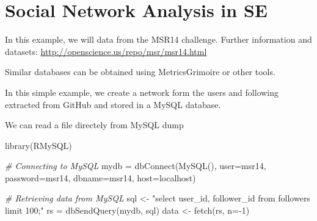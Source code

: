 \documentclass[
]{book}
\newenvironment{Shaded}{\begin{snugshade}}{\end{snugshade}}
\newcommand{\AttributeTok}[1]{\textcolor[rgb]{0.77,0.63,0.00}{#1}}
\newcommand{\CommentTok}[1]{\textcolor[rgb]{0.56,0.35,0.01}{\textit{#1}}}
\newcommand{\DecValTok}[1]{\textcolor[rgb]{0.00,0.00,0.81}{#1}}
\newcommand{\DocumentationTok}[1]{\textcolor[rgb]{0.56,0.35,0.01}{\textbf{\textit{#1}}}}
\newcommand{\FloatTok}[1]{\textcolor[rgb]{0.00,0.00,0.81}{#1}}
\newcommand{\FunctionTok}[1]{\textcolor[rgb]{0.00,0.00,0.00}{#1}}
\newcommand{\NormalTok}[1]{#1}
\newcommand{\OtherTok}[1]{\textcolor[rgb]{0.56,0.35,0.01}{#1}}
\newcommand{\SpecialCharTok}[1]{\textcolor[rgb]{0.00,0.00,0.00}{#1}}
\newcommand{\StringTok}[1]{\textcolor[rgb]{0.31,0.60,0.02}{#1}}
\begin{document}
\begin{Shaded}
\end{Shaded}

\hypertarget{social-network-analysis-in-se}{%
\chapter{Social Network Analysis in SE}\label{social-network-analysis-in-se}}

In this example, we will data from the MSR14 challenge. Further information and datasets:
\url{http://openscience.us/repo/msr/msr14.html}

Similar databases can be obtained using MetricsGrimoire or other tools.

In this simple example, we create a network form the users and following extracted from GitHub and stored in a MySQL database.

We can read a file directely from MySQL dump

\begin{Shaded}
\begin{Highlighting}[]
\FunctionTok{library}\NormalTok{(RMySQL)}

\CommentTok{\# Connecting to MySQL}
\NormalTok{mydb }\OtherTok{=} \FunctionTok{dbConnect}\NormalTok{(}\FunctionTok{MySQL}\NormalTok{(), }\AttributeTok{user=}\StringTok{\textquotesingle{}msr14\textquotesingle{}}\NormalTok{, }\AttributeTok{password=}\StringTok{\textquotesingle{}msr14\textquotesingle{}}\NormalTok{, }\AttributeTok{dbname=}\StringTok{\textquotesingle{}msr14\textquotesingle{}}\NormalTok{, }\AttributeTok{host=}\StringTok{\textquotesingle{}localhost\textquotesingle{}}\NormalTok{)}

\CommentTok{\# Retrieving data from MySQL}
\NormalTok{sql }\OtherTok{\textless{}{-}} \StringTok{"select user\_id, follower\_id from followers limit 100;"}
\NormalTok{rs }\OtherTok{=} \FunctionTok{dbSendQuery}\NormalTok{(mydb, sql)}
\NormalTok{data }\OtherTok{\textless{}{-}} \FunctionTok{fetch}\NormalTok{(rs, }\AttributeTok{n=}\SpecialCharTok{{-}}\DecValTok{1}\NormalTok{)}
\end{Highlighting}
\end{Shaded}
\end{document}
